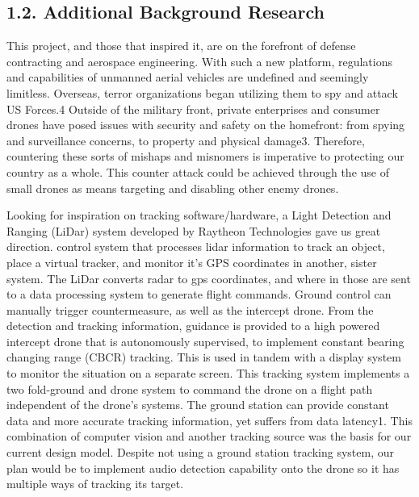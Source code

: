 \documentclass[10pt]{article}
\begin{document}
\subsection{1.2. Additional Background Research}
This project, and those that inspired it, are on the forefront of defense contracting and aerospace engineering. With such a new platform, regulations and capabilities of unmanned aerial vehicles are undefined and seemingly limitless. Overseas, terror organizations began utilizing them to spy and attack US Forces.4 Outside of the military front, private enterprises and consumer drones have posed issues with security and safety on the homefront: from spying and surveillance concerns, to property and physical damage3. Therefore, countering these sorts of mishaps and misnomers is imperative to protecting our country as a whole.  This counter attack could be achieved through the use of small drones as means targeting and disabling other enemy drones. 
 
Looking for inspiration on tracking software/hardware, a Light Detection and Ranging (LiDar) system developed by Raytheon Technologies gave us great direction.  control system that processes lidar information to track an object, place a virtual tracker, and monitor it’s GPS coordinates in another, sister system. The LiDar converts radar to gps coordinates, and where in those are sent to a data processing system to generate flight commands. Ground control can manually trigger countermeasure, as well as the intercept drone.  From the detection and tracking information, guidance is provided to a high powered intercept drone that is autonomously supervised, to implement constant bearing changing range (CBCR) tracking. This is used in tandem with a display system to monitor the situation on a separate screen.  This tracking system implements a two fold-ground and drone system to command the drone on a flight path independent of the drone’s systems. The ground station can provide constant data and more accurate tracking information, yet suffers from data latency1. This combination of computer vision and another tracking source was the basis for our current design model.  Despite not using a ground station tracking system, our plan would be to implement audio detection capability onto the drone so it has multiple ways of tracking its target.  
\end{document}

